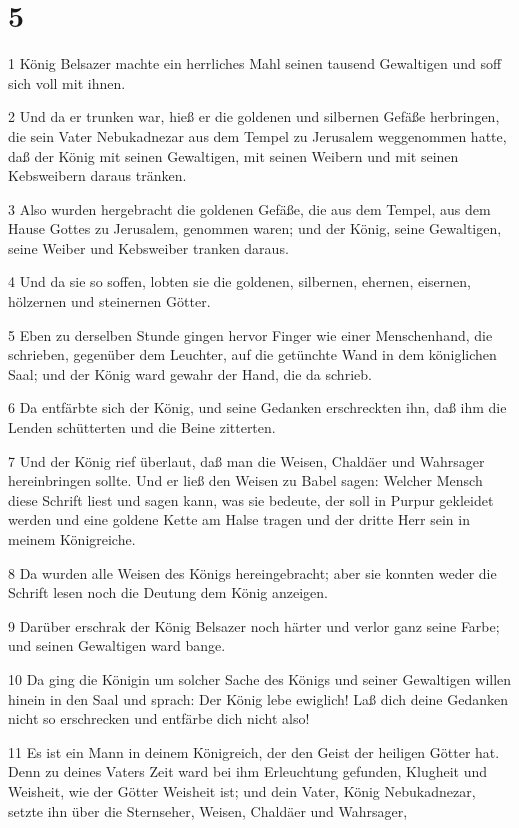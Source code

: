 \chapter{5}

\par 1 König Belsazer machte ein herrliches Mahl seinen tausend Gewaltigen und soff sich voll mit ihnen.
\par 2 Und da er trunken war, hieß er die goldenen und silbernen Gefäße herbringen, die sein Vater Nebukadnezar aus dem Tempel zu Jerusalem weggenommen hatte, daß der König mit seinen Gewaltigen, mit seinen Weibern und mit seinen Kebsweibern daraus tränken.
\par 3 Also wurden hergebracht die goldenen Gefäße, die aus dem Tempel, aus dem Hause Gottes zu Jerusalem, genommen waren; und der König, seine Gewaltigen, seine Weiber und Kebsweiber tranken daraus.
\par 4 Und da sie so soffen, lobten sie die goldenen, silbernen, ehernen, eisernen, hölzernen und steinernen Götter.
\par 5 Eben zu derselben Stunde gingen hervor Finger wie einer Menschenhand, die schrieben, gegenüber dem Leuchter, auf die getünchte Wand in dem königlichen Saal; und der König ward gewahr der Hand, die da schrieb.
\par 6 Da entfärbte sich der König, und seine Gedanken erschreckten ihn, daß ihm die Lenden schütterten und die Beine zitterten.
\par 7 Und der König rief überlaut, daß man die Weisen, Chaldäer und Wahrsager hereinbringen sollte. Und er ließ den Weisen zu Babel sagen: Welcher Mensch diese Schrift liest und sagen kann, was sie bedeute, der soll in Purpur gekleidet werden und eine goldene Kette am Halse tragen und der dritte Herr sein in meinem Königreiche.
\par 8 Da wurden alle Weisen des Königs hereingebracht; aber sie konnten weder die Schrift lesen noch die Deutung dem König anzeigen.
\par 9 Darüber erschrak der König Belsazer noch härter und verlor ganz seine Farbe; und seinen Gewaltigen ward bange.
\par 10 Da ging die Königin um solcher Sache des Königs und seiner Gewaltigen willen hinein in den Saal und sprach: Der König lebe ewiglich! Laß dich deine Gedanken nicht so erschrecken und entfärbe dich nicht also!
\par 11 Es ist ein Mann in deinem Königreich, der den Geist der heiligen Götter hat. Denn zu deines Vaters Zeit ward bei ihm Erleuchtung gefunden, Klugheit und Weisheit, wie der Götter Weisheit ist; und dein Vater, König Nebukadnezar, setzte ihn über die Sternseher, Weisen, Chaldäer und Wahrsager,
